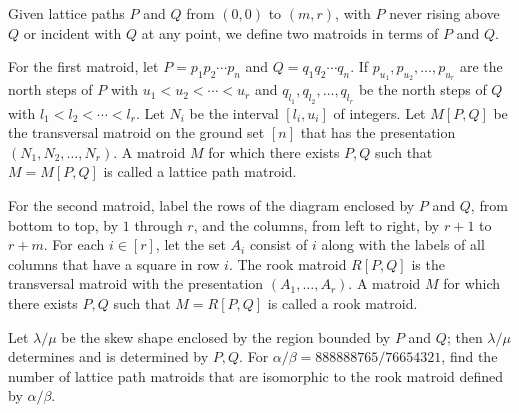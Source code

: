 Given lattice paths $P$ and $Q$ from $(0, 0)$ to $(m, r)$, with $P$ never rising above $Q$ or incident with $Q$ at any point, we define two matroids in terms of $P$ and $Q$.

For the first matroid, let $P = p_1p_2\cdots p_n$ and $Q = q_1q_2\cdots q_n$. If $p_{u_1}, p_{u_2}, \ldots, p_{u_r}$ are the north steps of $P$ with $u_1 < u_2 < \cdots < u_r$ and $q_{l_1}, q_{l_2}, \ldots, q_{l_r}$ be the north steps of $Q$ with $l_1 < l_2 < \cdots < l_r$.
Let $N_i$ be the interval $[l_i,u_i]$ of integers. Let $M[P,Q]$ be the transversal matroid on the ground set $[n]$ that has the presentation $(N_1,N_2,\ldots,N_r).$ A matroid $M$ for which there exists $P, Q$ such that $M = M[P, Q]$ is called a lattice path matroid.

For the second matroid, label the rows of the diagram enclosed by $P$ and $Q$, from bottom to top, by $1$ through $r$, and the columns, from left to right, by $r+1$ to $r+m$. For each $i \in [r]$, let the set $A_{i}$ consist of $i$ along with the labels of all columns that have a square in row $i$. The rook matroid $R[P, Q]$ is the transversal matroid with the presentation $(A_{1}, \ldots , A_{r})$. A matroid $M$ for which there exists $P, Q$ such that $M = R[P, Q]$ is called a rook matroid.

Let $\lambda/\mu$ be the skew shape enclosed by the region bounded by $P$ and $Q$; then $\lambda/\mu$ determines and is determined by $P, Q$. For $\alpha/\beta = 888888765/76654321$, find the number of lattice path matroids that are isomorphic to the rook matroid defined by $\alpha/\beta$.
